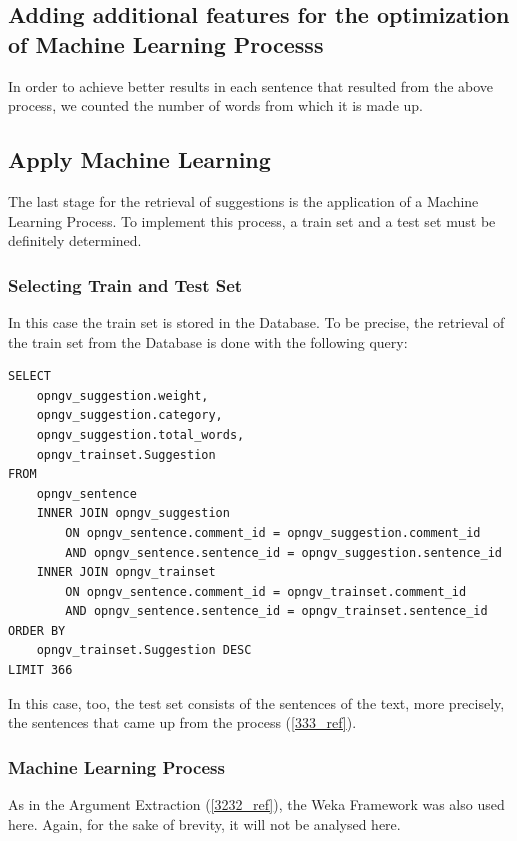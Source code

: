 \subsection{Adding additional features for the optimization of Machine Learning Processs}\label{334_ref}
In order to achieve better results in each sentence that resulted from the above process, we counted the number of words from which it is made up.

\subsection{Apply Machine Learning}\label{335_ref}
The last stage for the retrieval of suggestions is the application of a Machine Learning Process. To implement this process, a train set and a test set must be definitely determined.

\subsubsection{Selecting Train and Test Set}\label{3351_ref}
In this case the train set is stored in the Database. To be precise, the retrieval of the train set from the Database is done with the following query:\\

\lstset{language=SQL}
\begin{lstlisting}[frame=single, basicstyle=\small]
SELECT
	opngv_suggestion.weight,
	opngv_suggestion.category,
	opngv_suggestion.total_words,
	opngv_trainset.Suggestion
FROM
	opngv_sentence
	INNER JOIN opngv_suggestion
		ON opngv_sentence.comment_id = opngv_suggestion.comment_id
		AND opngv_sentence.sentence_id = opngv_suggestion.sentence_id
	INNER JOIN opngv_trainset
		ON opngv_sentence.comment_id = opngv_trainset.comment_id
		AND opngv_sentence.sentence_id = opngv_trainset.sentence_id
ORDER BY
	opngv_trainset.Suggestion DESC
LIMIT 366
\end{lstlisting}

In this case, too, the test set consists of the sentences of the text, more precisely, the sentences that came up from the process (\ref{333_ref}).

\subsubsection{Machine Learning Process}\label{3352_ref}
As in the Argument Extraction (\ref{3232_ref}), the Weka Framework was also used here. Again, for the sake of brevity, it will not be analysed here.

